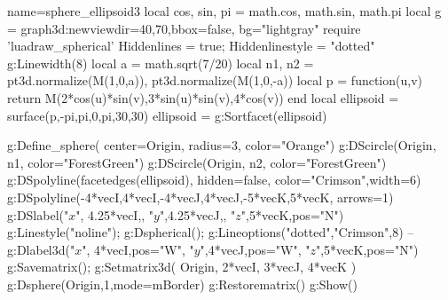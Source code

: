 \documentclass[border=5pt]{standalone}%
\begin{document}
\begin{luadraw}{name=sphere_ellipsoid3}
local cos, sin, pi = math.cos, math.sin, math.pi
local g = graph3d:new{viewdir={40,70},bbox=false, bg="lightgray"}
require 'luadraw_spherical'
Hiddenlines = true; Hiddenlinestyle = "dotted"
g:Linewidth(8)
local a = math.sqrt(7/20)
local n1, n2 = pt3d.normalize(M(1,0,a)), pt3d.normalize(M(1,0,-a))
local p = function(u,v) return M(2*cos(u)*sin(v),3*sin(u)*sin(v),4*cos(v)) end
local ellipsoid = surface(p,-pi,pi,0,pi,{30,30})
ellipsoid = g:Sortfacet(ellipsoid)

g:Define_sphere( {center=Origin, radius=3, color="Orange"})
g:DScircle({Origin, n1}, {color="ForestGreen"})
g:DScircle({Origin, n2}, {color="ForestGreen"})
g:DSpolyline(facetedges(ellipsoid), {hidden=false, color="Crimson",width=6})
g:DSpolyline({{-4*vecI,4*vecI},{-4*vecJ,4*vecJ},{-5*vecK,5*vecK}}, {arrows=1})
g:DSlabel("$x$", 4.25*vecI,{}, "$y$",4.25*vecJ,{}, "$z$",5*vecK,{pos="N"})
g:Linestyle("noline"); g:Dspherical(); g:Lineoptions("dotted","Crimson",8)
--g:Dlabel3d("$x$", 4*vecI,{pos="W"}, "$y$",4*vecJ,{pos="W"}, "$z$",5*vecK,{pos="N"})
g:Savematrix(); g:Setmatrix3d( {Origin, 2*vecI, 3*vecJ, 4*vecK} )
g:Dsphere(Origin,1,{mode=mBorder})
g:Restorematrix()
g:Show()
\end{luadraw}
\end{document}
